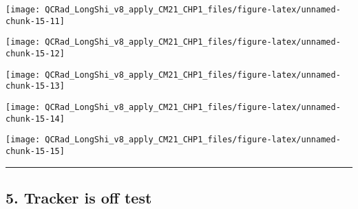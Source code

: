 \documentclass[
  10pt,
  a4paper,oneside]{article}
\begin{document}
\begin{center}\texttt{[image: QCRad\_LongShi\_v8\_apply\_CM21\_CHP1\_files/figure-latex/unnamed-chunk-15-11]} \end{center}

\begin{center}\texttt{[image: QCRad\_LongShi\_v8\_apply\_CM21\_CHP1\_files/figure-latex/unnamed-chunk-15-12]} \end{center}

\begin{center}\texttt{[image: QCRad\_LongShi\_v8\_apply\_CM21\_CHP1\_files/figure-latex/unnamed-chunk-15-13]} \end{center}

\begin{center}\texttt{[image: QCRad\_LongShi\_v8\_apply\_CM21\_CHP1\_files/figure-latex/unnamed-chunk-15-14]} \end{center}

\begin{center}\texttt{[image: QCRad\_LongShi\_v8\_apply\_CM21\_CHP1\_files/figure-latex/unnamed-chunk-15-15]} \end{center}

\begin{center}\rule{0.5\linewidth}{0.5pt}\end{center}

\newpage

\hypertarget{tracker-is-off-test}{%
\subsection{5. Tracker is off test}\label{tracker-is-off-test}}
\end{document}
